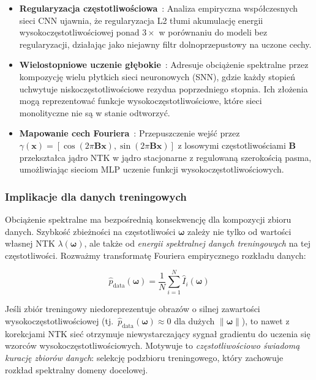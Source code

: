 \begin{itemize}
    \item \textbf{Regularyzacja częstotliwościowa}~\cite{freqreg2025}:
          Analiza empiryczna współczesnych sieci CNN ujawnia, że regularyzacja
          L2 tłumi akumulację energii wysokoczęstotliwościowej ponad
          $3\times$ w porównaniu do modeli bez regularyzacji, działając jako
          niejawny filtr dolnoprzepustowy na uczone cechy.

    \item \textbf{Wielostopniowe uczenie głębokie}~\cite{mgdl2024}: Adresuje
          obciążenie spektralne przez kompozycję wielu płytkich sieci
          neuronowych (SNN), gdzie każdy stopień uchwytuje
          niskoczęstotliwościowe rezydua poprzedniego stopnia.  Ich złożenia
          mogą reprezentować funkcje wysokoczęstotliwościowe, które sieci
          monolityczne nie są w stanie odtworzyć.

    \item \textbf{Mapowanie cech Fouriera}~\cite{tancik2020fourier}:
          Przepuszczenie wejść przez $\gamma(\mathbf{x}) =
          [\cos(2\pi\mathbf{B}\mathbf{x}),
          \sin(2\pi\mathbf{B}\mathbf{x})]$ z losowymi częstotliwościami
          $\mathbf{B}$ przekształca jądro NTK w jądro stacjonarne z
          regulowaną szerokością pasma, umożliwiając sieciom MLP uczenie
          funkcji wysokoczęstotliwościowych.
\end{itemize}

\subsubsection{Implikacje dla danych treningowych}

Obciążenie spektralne ma bezpośrednią konsekwencję dla kompozycji zbioru
danych.  Szybkość zbieżności na częstotliwości $\boldsymbol{\omega}$ zależy
nie tylko od wartości własnej NTK $\lambda(\boldsymbol{\omega})$, ale także
od \emph{energii spektralnej danych treningowych} na tej częstotliwości.
Rozważmy transformatę Fouriera empirycznego rozkładu danych:

\begin{equation}
    \hat{p}_{\text{data}}(\boldsymbol{\omega})
    = \frac{1}{N} \sum_{i=1}^{N}
      \hat{I}_i(\boldsymbol{\omega})
\end{equation}

Jeśli zbiór treningowy niedoreprezentuje obrazów o silnej zawartości
wysokoczęstotliwościowej (tj.\
$\hat{p}_{\text{data}}(\boldsymbol{\omega}) \approx 0$ dla dużych
$\|\boldsymbol{\omega}\|$), to nawet z korekcjami NTK sieć otrzymuje
niewystarczający sygnał gradientu do uczenia się wzorców
wysokoczęstotliwościowych.  Motywuje to \emph{częstotliwościowo świadomą
kurację zbiorów danych}: selekcję podzbioru treningowego, który zachowuje
rozkład spektralny domeny docelowej.


